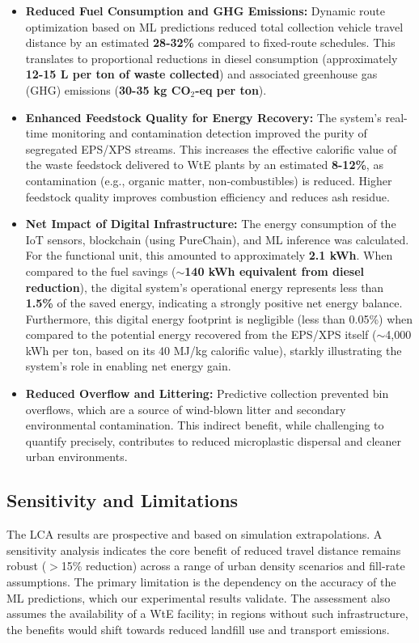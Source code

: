 \documentclass[final,5p,times,twocolumn]{elsarticle}
\begin{document}
\begin{itemize}
    \item \textbf{Reduced Fuel Consumption and GHG Emissions:} Dynamic route optimization based on ML predictions reduced total collection vehicle travel distance by an estimated \textbf{28-32\%} compared to fixed-route schedules. This translates to proportional reductions in diesel consumption (approximately \textbf{12-15 L per ton of waste collected}) and associated greenhouse gas (GHG) emissions (\textbf{30-35 kg CO$_2$-eq per ton}).
    \item \textbf{Enhanced Feedstock Quality for Energy Recovery:} The system's real-time monitoring and contamination detection improved the purity of segregated EPS/XPS streams. This increases the effective calorific value of the waste feedstock delivered to WtE plants by an estimated \textbf{8-12\%}, as contamination (e.g., organic matter, non-combustibles) is reduced. Higher feedstock quality improves combustion efficiency and reduces ash residue.
    \item \textbf{Net Impact of Digital Infrastructure:} The energy consumption of the IoT sensors, blockchain (using PureChain), and ML inference was calculated. For the functional unit, this amounted to approximately \textbf{2.1 kWh}. When compared to the fuel savings (\textbf{$\sim$140 kWh equivalent from diesel reduction}), the digital system's operational energy represents less than \textbf{1.5\%} of the saved energy, indicating a strongly positive net energy balance. Furthermore, this digital energy footprint is negligible (less than 0.05\%) when compared to the potential energy recovered from the EPS/XPS itself ($\sim$4,000 kWh per ton, based on its 40 MJ/kg calorific value), starkly illustrating the system's role in enabling net energy gain.
    \item \textbf{Reduced Overflow and Littering:} Predictive collection prevented bin overflows, which are a source of wind-blown litter and secondary environmental contamination. This indirect benefit, while challenging to quantify precisely, contributes to reduced microplastic dispersal and cleaner urban environments.
\end{itemize}

\subsection{Sensitivity and Limitations}
The LCA results are prospective and based on simulation extrapolations. A sensitivity analysis indicates the core benefit of reduced travel distance remains robust ($>$15\% reduction) across a range of urban density scenarios and fill-rate assumptions. The primary limitation is the dependency on the accuracy of the ML predictions, which our experimental results validate. The assessment also assumes the availability of a WtE facility; in regions without such infrastructure, the benefits would shift towards reduced landfill use and transport emissions.
\end{document}
